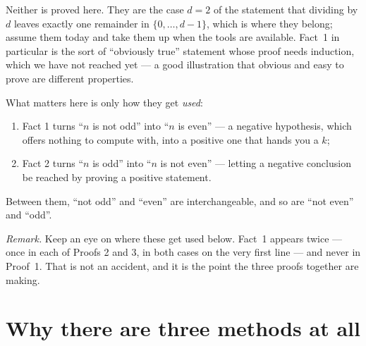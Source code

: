 \documentclass[12pt]{article}
\newenvironment{remark}
  {\par\medskip\noindent\textit{Remark.}\enspace}
  {\par\medskip}
\begin{document}
\noindent
Neither is proved here. They are the case $d=2$ of the statement that dividing
by $d$ leaves exactly one remainder in $\{0,\dots,d-1\}$, which is where they
belong; assume them today and take them up when the tools are available. Fact~1
in particular is the sort of ``obviously true'' statement whose proof needs
induction, which we have not reached yet --- a good illustration that obvious
and easy to prove are different properties.

What matters here is only how they get \emph{used}:
\begin{enumerate}[label=(\arabic*),leftmargin=2.4em,topsep=.3em,itemsep=.2em]
  \item Fact 1 turns ``$n$ is not odd'' into ``$n$ is even'' --- a negative
        hypothesis, which offers nothing to compute with, into a positive one
        that hands you a $k$;
  \item Fact 2 turns ``$n$ is odd'' into ``$n$ is not even'' --- letting a
        negative conclusion be reached by proving a positive statement.
\end{enumerate}
Between them, ``not odd'' and ``even'' are interchangeable, and so are ``not
even'' and ``odd''.

\begin{remark}
Keep an eye on where these get used below. Fact~1 appears twice --- once in
each of Proofs 2 and 3, in both cases on the very first line --- and never in
Proof~1. That is not an accident, and it is the point the three proofs together
are making.
\end{remark}

\section*{Why there are three methods at all}
\end{document}
